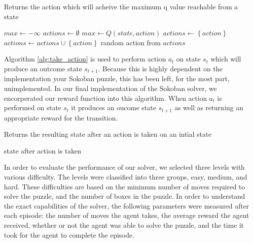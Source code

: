\documentclass[times, 10pt,twocolumn]{article}
\begin{document}
\begin{algorithm}
  \caption{Returns the action which will acheive the maximum q value reachable from a state}
  \begin{algorithmic}[1]
      \State $max\gets -\infty$
      \State $actions\gets \emptyset$
          \State $max\gets Q(state, action)$
          \State $actions\gets \left\{ {action}\right\}$
        \Else
          \State $actions \gets actions \cup \left\{ {action}\right\}$
        \EndIf
      \EndFor
      \State \Return random action from $actions$
    \EndFunction
  \end{algorithmic}
  \label{alg:maximize_action}
\end{algorithm}

Algorithm \ref{alg:take_action} is used to perform action $a_t$ on state $s_t$ which will produce an outcome state $s_{t+1}$.  Because this is highly dependent on the implementation your Sokoban puzzle, this has been left, for the most part, unimplemented.  In our final implementation of the Sokoban solver, we encorperated our reward function into this algorithm.  When action $a_t$ is performed on state $s_t$ it produces an oucome state $s_{t+1}$ as well as returning an appropriate reward for the transition.

\begin{algorithm}
  \caption{Returns the resulting state after an action is taken on an intial state}
  \begin{algorithmic}[1]
      \State \Return state after action is taken
    \EndFunction
  \end{algorithmic}
  \label{alg:take_action}
\end{algorithm}


In order to evaluate the performance of our solver, we selected three levels with various difficulty. The levels were classified into three groups, easy, medium, and hard. These difficulties are based on the minimum number of moves required to solve the puzzle, and the number of boxes in the puzzle. In order to understand the exact capabilities of the solver, the following parameters were measured after each episode: the number of moves the agent takes, the average reward the agent received, whether or not the agent was able to solve the puzzle, and the time it took for the agent to complete the episode. 
\end{document}
